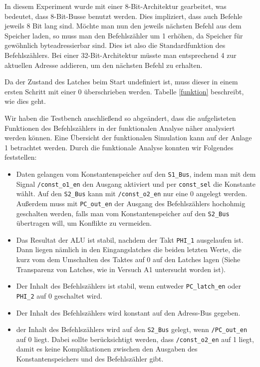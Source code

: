\documentclass[12pt,a4paper]{scrartcl}
\begin{document}
In diesem Experiment wurde mit einer 8-Bit-Architektur gearbeitet, was bedeutet, dass 8-Bit-Busse benutzt werden.
Dies impliziert, dass auch Befehle jeweils 8 Bit lang sind.
M\"ochte man nun den jeweils n\"achsten Befehl aus dem Speicher laden, so muss man den Befehlsz\"ahler um 1 erh\"ohen, da Speicher f\"ur gew\"ohnlich byteadressierbar sind.
Dies ist also die Standardfunktion des Befehlsz\"ahlers.
Bei einer 32-Bit-Architektur m\"usste man entsprechend 4 zur aktuellen Adresse addieren, um den n\"achsten Befehl zu erhalten.

Da der Zustand des Latches beim Start undefiniert ist, muss dieser in einem ersten Schritt mit einer 0 \"uberschrieben werden.
Tabelle \ref{funktion} beschreibt, wie dies geht.

Wir haben die Testbench anschlie\ss end so abge\"andert, dass die aufgelisteten Funktionen des Befehlsz\"ahlers in der funktionalen Analyse n\"aher analysiert werden k\"onnen.
Eine \"Ubersicht der funktionalen Simulation kann auf der Anlage 1 betrachtet werden.
Durch die funktionale Analyse konnten wir Folgendes feststellen:

\begin{itemize}
  \item Daten gelangen vom Konstantenspeicher auf den \texttt{S1\_Bus}, indem man mit dem Signal \texttt{/const\_o1\_en} den Ausgang aktiviert und per \texttt{const\_sel} die Konstante w\"ahlt. Auf den \texttt{S2\_Bus} kann mit \texttt{/const\_o2\_en} nur eine 0 angelegt werden. Au\ss erdem muss mit \texttt{PC\_out\_en} der Ausgang des Befehlsz\"ahlers hochohmig geschalten werden, falls man vom Konstantenspeicher auf den \texttt{S2\_Bus} \"ubertragen will, um Konflikte zu vermeiden.
  \item Das Resultat der ALU ist stabil, nachdem der Takt \texttt{PHI\_1} ausgelaufen ist. Dann liegen n\"amlich in den Eingangslatches die beiden letzten Werte, die kurz vom dem Umschalten des Taktes auf 0 auf den Latches lagen (Siehe Transparenz von Latches, wie in Versuch A1 untersucht worden ist).
  \item Der Inhalt des Befehlsz\"ahlers ist stabil, wenn entweder \texttt{PC\_latch\_en} oder \texttt{PHI\_2} auf 0 geschaltet wird.
  \item Der Inhalt des Befehlsz\"ahlers wird konstant auf den Adress-Bus gegeben.
  \item der Inhalt des Befehlsz\"ahlers wird auf den \texttt{S2\_Bus} gelegt, wenn \texttt{/PC\_out\_en} auf 0 liegt. Dabei sollte ber\"ucksichtigt werden, dass \texttt{/const\_o2\_en} auf 1 liegt, damit es keine Komplikationen zwischen den Ausgaben des Konstantenspeichers und des Befehlsz\"ahler gibt.
\end{itemize}
\end{document}
